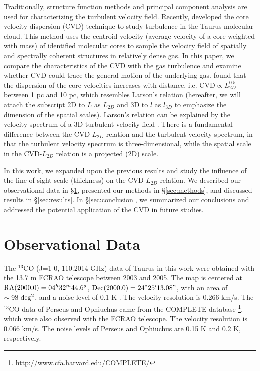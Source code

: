 \documentclass[iop,revtex4]{emulateapj}
\begin{document}
Traditionally, structure function methods \citep[e.g.][]{Turbulence_Brunt2002} and principal component analysis \cite[PCA,][]{Heyer1997,Brunt2003} are used for characterizing the turbulent velocity field. Recently, \cite{Qian2012} developed the core velocity dispersion (CVD) technique to study turbulence in the Taurus molecular cloud. This method uses the centroid velocity (average velocity of a core weighted with mass) of identified molecular cores to sample the velocity field of spatially and spectrally coherent structures in relatively dense gas. In this paper, we compare the characteristics of the CVD with the gas turbulence and examine whether CVD could trace the general motion  of the underlying gas. \cite{Qian2012} found that the dispersion of the core velocities increases with distance, i.e. CVD$\propto L_{2D}^{0.5}$ between 1 pc and 10 pc, which resembles Larson's relation (hereafter, we will attach the subscript 2D to $L$ as $L_{2D}$ and 3D to $l$ as $l_{3D}$ to emphasize the dimension of the spatial scales). Larson's relation can be explained by the velocity spectrum of a 3D turbulent velocity field \citep{Kritsuk2013}. There is a fundamental difference between the CVD-$L_{2D}$ relation and the turbulent velocity spectrum, in that the turbulent velocity spectrum is three-dimensional, while the spatial scale in the CVD-$L_{2D}$ relation is a projected (2D) scale.


In this work, we expanded upon the previous results and study the influence of the line-of-sight scale (thickness)
on the CVD-$L_{2D}$ relation. We described our observational data in \S\ref{sec:data},  presented our methods in \S\ref{sec:methods}, and discussed results in \S\ref{sec:results}. In \S\ref{sec:conclusion}, we summarized our conclusions and addressed the potential application of the CVD in future studies.


\section{Observational Data}
\label{sec:data}


The $^{13}$CO (J=1-0, 110.2014 GHz) data of Taurus in this work were obtained with the 13.7 m FCRAO telescope between 2003 and 2005. The map is centered at ${\rm RA}(2000.0)=04^h 32^m 44.6^s$, ${\rm Dec}(2000.0)=24^\circ 25' 13.08"$, with an area of $\sim 98\ \rm
deg^2$, and a noise level of 0.1 K  \citep{Narayanan2008}.
The velocity resolution is 0.266 km/s. The $^{13}$CO data of Perseus and Ophiuchus came from the COMPLETE database \citep{Ridge2006}\footnote{http://www.cfa.harvard.edu/COMPLETE/}, which were also observed with the FCRAO telescope. The velocity resolution is 0.066 km/s. The noise levels of Perseus and Ophiuchus are 0.15 K and 0.2 K, respectively.
\end{document}
